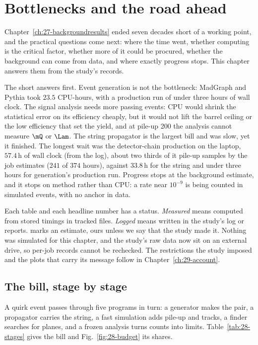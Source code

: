 \chapter{Bottlenecks and the road ahead}\label{ch:28-bottlenecks}

Chapter~\ref{ch:27-backgroundresults} ended seven decades short of a working point, and the practical questions come next: where the time went, whether computing is the critical factor, whether more of it could be procured, whether the background can come from data, and where exactly progress stops. This chapter answers them from the study's records.

The short answers first. Event generation is not the bottleneck: MadGraph and Pythia took $23.5$ CPU-hours, with a production run of under three hours of wall clock. The signal analysis needs more passing events: CPU would shrink the statistical error on its efficiency cheaply, but it would not lift the barrel ceiling or the low efficiency that set the yield, and at pile-up 200 the analysis cannot measure $\mQ$ or $\Lam$. The string propagator is the largest bill and was slow, yet it finished. The longest wait was the detector-chain production on the laptop, $57.4$\,h of wall clock (from the log), about two thirds of it pile-up samples by the job estimates ($241$ of $374$ hours), against $33.8$\,h for the string and under three hours for generation's production run. Progress stops at the background estimate, and it stops on method rather than CPU: a rate near $10^{-9}$ is being counted in simulated events, with no anchor in data.

Each table and each headline number has a status. \emph{Measured} means computed from stored timings in tracked files. \emph{Logged} means written in the study's log or reports. \EST{} marks an estimate, ours unless we say that the study made it. Nothing was simulated for this chapter, and the study's raw data now sit on an external drive, so per-job records cannot be rechecked. The restrictions the study imposed and the plots that carry its message follow in Chapter~\ref{ch:29-account}.

\section{The bill, stage by stage}\label{sec:28-hours}

A quirk event passes through five programs in turn: a generator makes the pair, a propagator carries the string, a fast simulation adds pile-up and tracks, a finder searches for planes, and a frozen analysis turns counts into limits. Table~\ref{tab:28-stages} gives the bill and Fig.~\ref{fig:28-budget} its shares.

